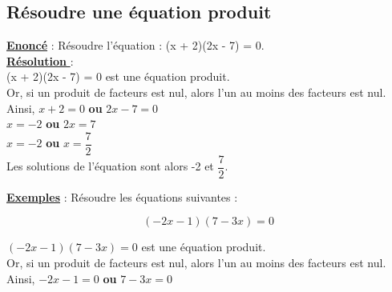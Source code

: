 \documentclass[a4paper,10pt,twoside,french]{article}
\begin{document}
\subsection{Résoudre une équation produit}

\underline{\textbf{Enoncé}} : Résoudre l'équation : (x + 2)(2x - 7) = 0.\\

\underline{\textbf{Résolution }} : \\

(x + 2)(2x - 7) = 0 est une équation produit.\\

Or, si un produit de facteurs est nul, alors l'un au moins des facteurs est nul.\\

Ainsi, \hspace*{0.6cm} $x+2 = 0$ \hspace*{1cm} \textbf{ou} \hspace*{1cm}$2x-7 = 0$\\

\hspace*{1.6cm} $x= -2$ \hspace*{1.5cm} \textbf{ou} \hspace*{1cm}$2x = 7$\\

\hspace*{1.6cm} $x= -2$ \hspace*{1.5cm} \textbf{ou} \hspace*{1cm}$x =\dfrac{7}{2}$\\

Les solutions de l'équation sont alors -2 et $\dfrac{7}{2}$.\\

\newpage

\underline{\textbf{Exemples}} : Résoudre les équations suivantes : 




\color{black}


 $$ (-2x-1)(7-3x)=0$$
 
 \color{red}
 
 
 $ (-2x-1)(7-3x)=0$ est une équation produit.\\

Or, si un produit de facteurs est nul, alors l'un au moins des facteurs est nul.\\

Ainsi, \hspace*{0.6cm} $-2x-1 = 0$ \hspace*{1cm} \textbf{ou} \hspace*{1cm}$7-3x = 0$\\
\end{document}

